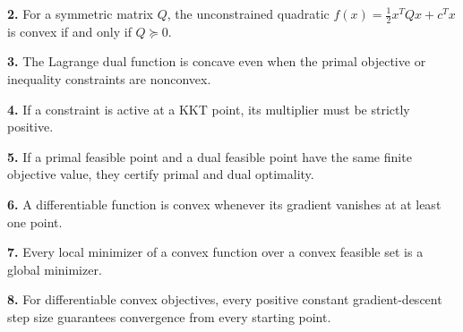 \documentclass[11pt,a4paper]{article}
\begin{document}
\par\noindent\begin{minipage}{\linewidth}
\textbf{2.} For a symmetric matrix \(Q\), the unconstrained quadratic \(f(x)=\frac12x^TQx+c^Tx\) is convex if and only if \(Q\succeq0\).
\end{minipage}\par\vspace{3mm}
\par\noindent\begin{minipage}{\linewidth}
\textbf{3.} The Lagrange dual function is concave even when the primal objective or inequality constraints are nonconvex.
\end{minipage}\par\vspace{3mm}
\par\noindent\begin{minipage}{\linewidth}
\textbf{4.} If a constraint is active at a KKT point, its multiplier must be strictly positive.
\end{minipage}\par\vspace{3mm}
\par\noindent\begin{minipage}{\linewidth}
\textbf{5.} If a primal feasible point and a dual feasible point have the same finite objective value, they certify primal and dual optimality.
\end{minipage}\par\vspace{3mm}
\par\noindent\begin{minipage}{\linewidth}
\textbf{6.} A differentiable function is convex whenever its gradient vanishes at at least one point.
\end{minipage}\par\vspace{3mm}
\par\noindent\begin{minipage}{\linewidth}
\textbf{7.} Every local minimizer of a convex function over a convex feasible set is a global minimizer.
\end{minipage}\par\vspace{3mm}
\par\noindent\begin{minipage}{\linewidth}
\textbf{8.} For differentiable convex objectives, every positive constant gradient-descent step size guarantees convergence from every starting point.
\end{minipage}\par\vspace{3mm}
\end{document}
